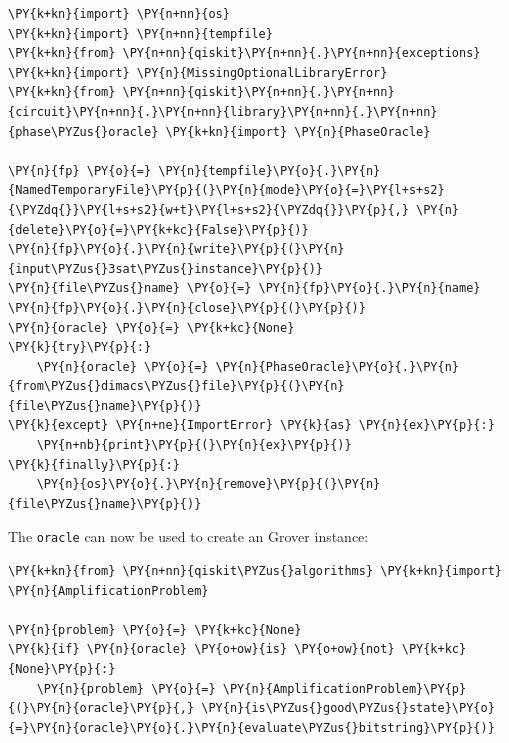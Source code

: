     \begin{tcolorbox}[breakable, size=fbox, boxrule=1pt, pad at break*=1mm,colback=cellbackground, colframe=cellborder]
\begin{Verbatim}[commandchars=\\\{\}]
\PY{k+kn}{import} \PY{n+nn}{os}
\PY{k+kn}{import} \PY{n+nn}{tempfile}
\PY{k+kn}{from} \PY{n+nn}{qiskit}\PY{n+nn}{.}\PY{n+nn}{exceptions} \PY{k+kn}{import} \PY{n}{MissingOptionalLibraryError}
\PY{k+kn}{from} \PY{n+nn}{qiskit}\PY{n+nn}{.}\PY{n+nn}{circuit}\PY{n+nn}{.}\PY{n+nn}{library}\PY{n+nn}{.}\PY{n+nn}{phase\PYZus{}oracle} \PY{k+kn}{import} \PY{n}{PhaseOracle}

\PY{n}{fp} \PY{o}{=} \PY{n}{tempfile}\PY{o}{.}\PY{n}{NamedTemporaryFile}\PY{p}{(}\PY{n}{mode}\PY{o}{=}\PY{l+s+s2}{\PYZdq{}}\PY{l+s+s2}{w+t}\PY{l+s+s2}{\PYZdq{}}\PY{p}{,} \PY{n}{delete}\PY{o}{=}\PY{k+kc}{False}\PY{p}{)}
\PY{n}{fp}\PY{o}{.}\PY{n}{write}\PY{p}{(}\PY{n}{input\PYZus{}3sat\PYZus{}instance}\PY{p}{)}
\PY{n}{file\PYZus{}name} \PY{o}{=} \PY{n}{fp}\PY{o}{.}\PY{n}{name}
\PY{n}{fp}\PY{o}{.}\PY{n}{close}\PY{p}{(}\PY{p}{)}
\PY{n}{oracle} \PY{o}{=} \PY{k+kc}{None}
\PY{k}{try}\PY{p}{:}
    \PY{n}{oracle} \PY{o}{=} \PY{n}{PhaseOracle}\PY{o}{.}\PY{n}{from\PYZus{}dimacs\PYZus{}file}\PY{p}{(}\PY{n}{file\PYZus{}name}\PY{p}{)}
\PY{k}{except} \PY{n+ne}{ImportError} \PY{k}{as} \PY{n}{ex}\PY{p}{:}
    \PY{n+nb}{print}\PY{p}{(}\PY{n}{ex}\PY{p}{)}
\PY{k}{finally}\PY{p}{:}
    \PY{n}{os}\PY{o}{.}\PY{n}{remove}\PY{p}{(}\PY{n}{file\PYZus{}name}\PY{p}{)}
\end{Verbatim}
\end{tcolorbox}

    The \texttt{oracle} can now be used to create an Grover instance:

    \begin{tcolorbox}[breakable, size=fbox, boxrule=1pt, pad at break*=1mm,colback=cellbackground, colframe=cellborder]
\begin{Verbatim}[commandchars=\\\{\}]
\PY{k+kn}{from} \PY{n+nn}{qiskit\PYZus{}algorithms} \PY{k+kn}{import} \PY{n}{AmplificationProblem}

\PY{n}{problem} \PY{o}{=} \PY{k+kc}{None}
\PY{k}{if} \PY{n}{oracle} \PY{o+ow}{is} \PY{o+ow}{not} \PY{k+kc}{None}\PY{p}{:}
    \PY{n}{problem} \PY{o}{=} \PY{n}{AmplificationProblem}\PY{p}{(}\PY{n}{oracle}\PY{p}{,} \PY{n}{is\PYZus{}good\PYZus{}state}\PY{o}{=}\PY{n}{oracle}\PY{o}{.}\PY{n}{evaluate\PYZus{}bitstring}\PY{p}{)}
\end{Verbatim}
\end{tcolorbox}

